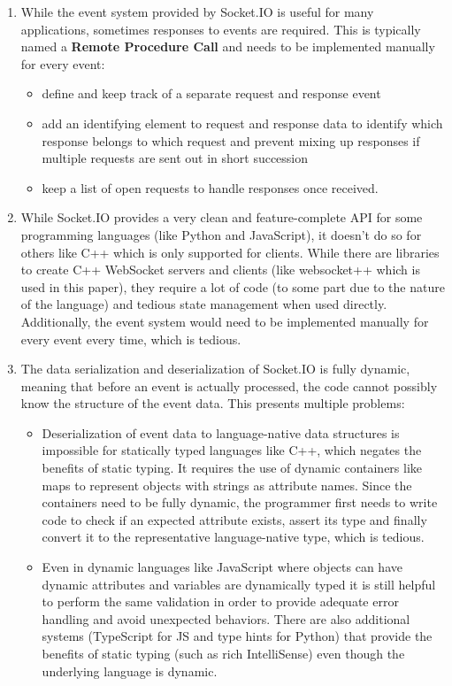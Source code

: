 \documentclass[conference]{IEEEtran}
\begin{document}
\begin{enumerate}
    \item While the event system provided by Socket.IO is useful for many applications, sometimes responses to events are required. This is typically named a \textbf{Remote Procedure Call} and needs to be implemented manually for every event:
    \begin{itemize}
        \item define and keep track of a separate request and response event
        \item add an identifying element to request and response data to identify which response belongs to which request and prevent mixing up responses if multiple requests are sent out in short succession
        \item keep a list of open requests to handle responses once received.
    \end{itemize}
    \item While Socket.IO provides a very clean and feature-complete API for some programming languages (like Python and JavaScript), it doesn't do so for others like C++ which is only supported for clients. While there are libraries to create C++ WebSocket servers and clients (like websocket++ which is used in this paper), they require a lot of code (to some part due to the nature of the language) and tedious state management when used directly. Additionally, the event system would need to be implemented manually for every event every time, which is tedious. \cite{b4}
    \item The data serialization and deserialization of Socket.IO is fully dynamic, meaning that before an event is actually processed, the code cannot possibly know the structure of the event data. This presents multiple problems:
    \begin{itemize}
        \item Deserialization of event data to language-native data structures is impossible for statically typed languages like C++, which negates the benefits of static typing. It requires the use of dynamic containers like maps to represent objects with strings as attribute names. Since the containers need to be fully dynamic, the programmer first needs to write code to check if an expected attribute exists, assert its type and finally convert it to the representative language-native type, which is tedious.
        \item Even in dynamic languages like JavaScript where objects can have dynamic attributes and variables are dynamically typed it is still helpful to perform the same validation in order to provide adequate error handling and avoid unexpected behaviors. There are also additional systems (TypeScript for JS and type hints for Python) that provide the benefits of static typing (such as rich IntelliSense) even though the underlying language is dynamic.
    \end{itemize}
\end{enumerate}
\end{document}
